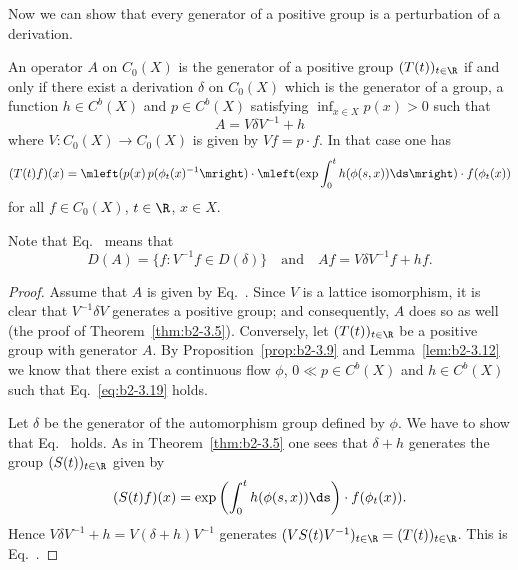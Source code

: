 Now we can show that every generator of a positive group is a perturbation of a derivation.
\begin{theorem}\label{thm:b2-3.14}
An operator $A$ on $C_{0}(X)$ is the generator of a positive group $(T(t))_{t \in \R}$ if and only if there exist a derivation $\delta$ on $C_{0}(X)$ which is the generator of a group, a function $h \in C^{b}(X)$ and $p \in C^{b}(X)$ satisfying $\inf_{x \in X} p(x) > 0$ such that
\begin{equation}\label{eq:b2-3.18}
A = V\delta V^{-1} + h
\end{equation}
where $V \colon C_{0}(X) \to C_{0}(X)$ is given by $Vf = p \cdot f$. In that case one has
\begin{equation}\label{eq:b2-3.19}
(T(t)f)(x) = \mleft( p(x) \, p(\phi_{t}(x)^{-1} \mright) \cdot 
\mleft(\exp \int_{0}^{t} h(\phi(s,x)) \ds \mright) \cdot f(\phi_{t}(x))
\end{equation}
for all $f \in C_{0}(X)$, $t \in \R$, $x \in X$.
\end{theorem}
Note that  Eq.~ means that 
%
\[
	D(A) = \{ f \colon V^{-1}f \in D(\delta) \}
	\quad \text{and} \quad
	Af = V\delta V^{-1}f + hf .
\]
\begin{proof}
Assume that $A$ is given by Eq.~.
Since $V$ is a lattice isomorphism, it is clear that $V^{-1}\delta V$ generates a positive group; and consequently, $A$ does so as well (\cf the proof of Theorem~\ref{thm:b2-3.5}).
Conversely, let $(T(t))_{t \in \R}$ be a positive group with generator $A$.
By Proposition~\ref{prop:b2-3.9} and Lemma~\ref{lem:b2-3.12} we know that there exist a continuous flow $\phi$, $0 \ll p \in C^{b}(X)$ and $h \in C^{b}(X)$ such that Eq.~\eqref{eq:b2-3.19} holds.

Let $\delta$ be the generator of the automorphism group defined by $\phi$.
We have to show that Eq.~ holds.
As in Theorem~\ref{thm:b2-3.5} one sees that $\delta + h$ generates the group $(S(t))_{t \in \R}$ given by 
\[
(S(t)f)(x) = \exp\left(\int_{0}^{t} h(\phi(s,x)) \ds \right) \cdot f(\phi_{t}(x)).
\]
Hence $V\delta V^{-1} + h = V(\delta + h)V^{-1}$ generates $(VS(t)V^{-1})_{t \in \R} = (T(t))_{t \in \R}$.
This is Eq.~.
\end{proof}
